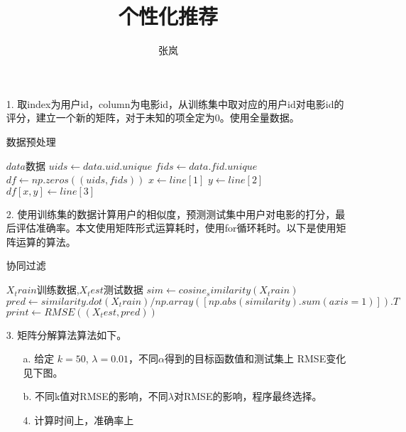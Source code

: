 \documentclass[12pt]{article}
\title{个性化推荐}
\author{张岚}
\begin{document}
\maketitle

\begin{enumerate}
\item[1.] 取index为用户id，column为电影id，从训练集中取对应的用户id对电影id的评分，建立一个新的矩阵，对于未知的项全定为0。使用全量数据。
 \begin{algorithm}
        \caption{数据预处理}
        \begin{algorithmic}[1] %
            \Require $data$数据
                \State $uids \gets data.uid.unique$
                \State $fids \gets data.fid.unique$
                \State $df \gets np.zeros((uids,fids))$
                	    \State $x \gets line[1]$
	    	    \State $y \gets line[2]$
                     \State $df[x,y]  \gets line[3]$
                \EndFor
                \State {}
            \EndFunction    
        \end{algorithmic}
\end{algorithm}

\item[2.] 使用训练集的数据计算用户的相似度，预测测试集中用户对电影的打分，最后评估准确率。本文使用矩阵形式运算耗时，使用for循环耗时。以下是使用矩阵运算的算法。
 \begin{algorithm}
        \caption{协同过滤}
        \begin{algorithmic}[1] %
            \Require $X_train$训练数据,$X_test$测试数据
                \State $sim \gets cosine_similarity(X_train)$
                \State $pred \gets similarity.dot(X_train) / np.array([np.abs(similarity).sum(axis=1)]).T$
                \State $print  \gets RMSE((X_test,pred))$
            \EndFunction    
        \end{algorithmic}
\end{algorithm}

\item[3.] 矩阵分解算法算法如下。
\begin{enumerate}
\item[a.] 给定 $k=50$, $\lambda = 0.01$，不同$\alpha$得到的目标函数值和测试集上 RMSE变化见下图。
\item[b.] 不同k值对RMSE的影响，不同$\lambda$对RMSE的影响，程序最终选择。

\item[4.] 计算时间上，准确率上
\end{enumerate}
\end{enumerate}
\end{document}
